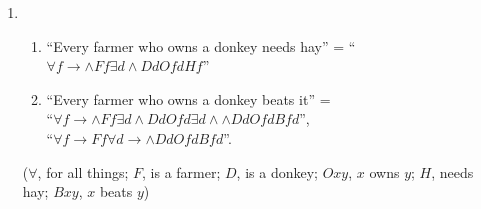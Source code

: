 \documentclass{homework}
\begin{document}
\begin{enumerate}
		\item
		\begin{enumerate}
			\item ``Every farmer who owns a donkey needs hay'' = ``$\forall f \rightarrow \land F f \exists d \land D d O f d H f$''
			\item ``Every farmer who owns a donkey beats it'' = \\
			``$\forall f \rightarrow \land F f \exists d \land D d O f d \exists d \land \land D d O f d B f d$'', \\
			``$\forall f \rightarrow F f \forall d \rightarrow \land D d O f d B f d$''.
		\end{enumerate}
		($\forall$, for all things; $F$, is a farmer; $D$, is a donkey; $Oxy$, $x$ owns $y$; $H$, needs hay; $Bxy$, $x$ beats $y$)
	\end{enumerate}
\end{document}
